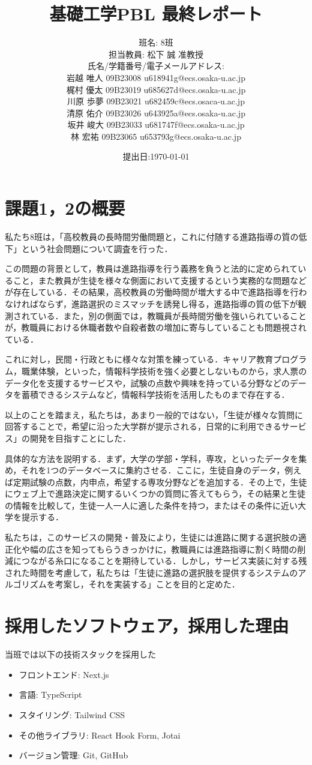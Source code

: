 \documentclass[a4j,titlepage]{jarticle}
\title{基礎工学PBL 最終レポート}
\author{班名: 8班\\
担当教員: 松下 誠 准教授\\
氏名/学籍番号/電子メールアドレス:\\
岩越 唯人 09B23008 u618941g@ecs.osaka-u.ac.jp\\
梶村 優太 09B23019 u685627d@ecs.osaka-u.ac.jp\\
川原 歩夢 09B23021 u682459c@ecs.osaca-u.ac.jp\\
清原 佑介 09B23026 u643925a@ecs.osaka-u.ac.jp\\
坂井 峻大 09B23033 u681747f@ecs.osaka-u.ac.jp\\
林 宏祐 09B23065 u653793g@ecs.osaka-u.ac.jp
}
\date{提出日:\today}
\begin{document}
\maketitle

\section{課題1，2の概要}
私たち8班は，「高校教員の長時間労働問題と，これに付随する進路指導の質の低下」という社会問題について調査を行った．

この問題の背景として，教員は進路指導を行う義務を負うと法的に定められていること，また教員が生徒を様々な側面において支援するという実務的な問題などが存在している．その結果，高校教員の労働時間が増大する中で進路指導を行わなければならず，進路選択のミスマッチを誘発し得る，進路指導の質の低下が観測されている．また，別の側面では，教職員が長時間労働を強いられていることが，教職員における休職者数や自殺者数の増加に寄与していることも問題視されている．

これに対し，民間・行政ともに様々な対策を練っている．キャリア教育プログラム，職業体験，といった，情報科学技術を強く必要としないものから，求人票のデータ化を支援するサービスや，試験の点数や興味を持っている分野などのデータを蓄積できるシステムなど，情報科学技術を活用したものまで存在する．

以上のことを踏まえ，私たちは，あまり一般的ではない，「生徒が様々な質問に回答することで，希望に沿った大学群が提示される，日常的に利用できるサービス」の開発を目指すことにした．

具体的な方法を説明する．まず，大学の学部・学科，専攻，といったデータを集め，それを1つのデータベースに集約させる．ここに，生徒自身のデータ，例えば定期試験の点数，内申点，希望する専攻分野などを追加する．その上で，生徒にウェブ上で進路決定に関するいくつかの質問に答えてもらう，その結果と生徒の情報を比較して，生徒一人一人に適した条件を持つ，またはその条件に近い大学を提示する．

私たちは，このサービスの開発・普及により，生徒には進路に関する選択肢の適正化や幅の広さを知ってもらうきっかけに，教職員には進路指導に割く時間の削減につながる糸口になることを期待している．しかし，サービス実装に対する残された時間を考慮して，私たちは「生徒に進路の選択肢を提供するシステムのアルゴリズムを考案し，それを実装する」ことを目的と定めた．

\section{採用したソフトウェア，採用した理由}
当班では以下の技術スタックを採用した
\begin{itemize}
\item フロントエンド: Next.js
\item 言語: TypeScript
\item スタイリング: Tailwind CSS
\item その他ライブラリ: React Hook Form, Jotai
\item バージョン管理: Git, GitHub
\end{itemize}
\end{document}
